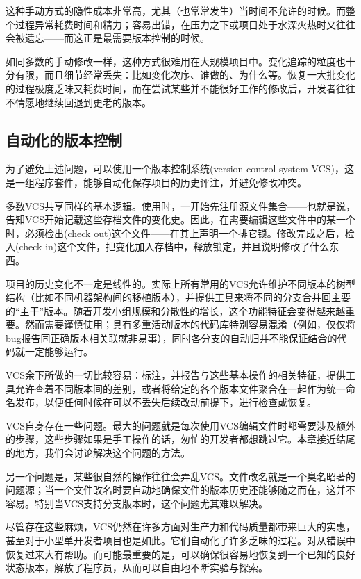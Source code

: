 \documentclass[12pt,oneside]{book}
\begin{document}
这种手动方式的隐性成本非常高，尤其（也常常发生）当时间不允许的时候。而整个过程异常耗费时间和精力；容易出错，在压力之下或项目处于水深火热时又往往会被遗忘——而这正是最需要版本控制的时候。

如同多数的手动修改一样，这种方式很难用在大规模项目中。变化追踪的粒度也十分有限，而且细节经常丢失：比如变化次序、谁做的、为什么等。恢复一大批变化的过程极度乏味又耗费时间，而在尝试某些并不能很好工作的修改后，开发者往往不情愿地继续回退到更老的版本。


\subsection{自动化的版本控制}
为了避免上述问题，可以使用一个版本控制系统(version-control system VCS)，这是一组程序套件，能够自动化保存项目的历史评注，并避免修改冲突。

多数VCS共享同样的基本逻辑。使用时，一开始先注册源文件集合——也就是说，告知VCS开始记载这些存档文件的变化史。因此，在需要编辑这些文件中的某一个时，必须检出(check out)这个文件——在其上声明一个排它锁。修改完成之后，检入(check in)这个文件，把变化加入存档中，释放锁定，并且说明修改了什么东西。

项目的历史变化不一定是线性的。实际上所有常用的VCS允许维护不同版本的树型结构（比如不同机器架构间的移植版本），并提供工具来将不同的分支合并回主要的“主干”版本。随着开发小组规模和分散性的增长，这个功能特征会变得越来越重要。然而需要谨慎使用；具有多重活动版本的代码库特别容易混淆（例如，仅仅将bug报告同正确版本相关联就非易事），同时各分支的自动归并不能保证结合的代码就一定能够运行。

VCS余下所做的一切比较容易：标注，并报告与这些基本操作的相关特征，提供工具允许查着不同版本间的差别，或者将给定的各个版本文件聚合在一起作为统一命名发布，以便任何时候在可以不丢失后续改动前提下，进行检查或恢复。

VCS自身存在一些问题。最大的问题就是每次使用VCS编辑文件时都需要涉及额外的步骤，这些步骤如果是手工操作的话，匆忙的开发者都想跳过它。本章接近结尾的地方，我们会讨论解决这个问题的方法。

另一个问题是，某些很自然的操作往往会弄乱VCS。文件改名就是一个臭名昭著的问题源；当一个文件改名时要自动地确保文件的版本历史还能够随之而在，这并不容易。特别当VCS支持分支版本时，这个问题尤其难以解决。

尽管存在这些麻烦，VCS仍然在许多方面对生产力和代码质量都带来巨大的实惠，甚至对于小型单开发者项目也是如此。它们自动化了许多乏味的过程。对从错误中恢复过来大有帮助。而可能最重要的是，可以确保很容易地恢复到一个已知的良好状态版本，解放了程序员，从而可以自由地不断实验与探索。
\end{document}
